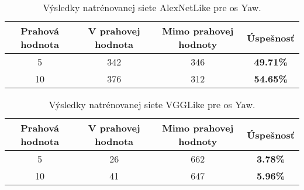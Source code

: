 \begin{table}[H]
    \centering
    \begin{tabular}{|c|c|c|c|}
        \hline
        Prahová hodnota & V prahovej hodnota       & Mimo prahovej hodnoty    & Úspešnosť    \\ \hline
        5               & {\color[HTML]{009901} 342} & {\color[HTML]{9A0000} 346} & \textbf{49.71\%} \\ \hline
        10              & {\color[HTML]{009901} 376} & {\color[HTML]{9A0000} 312} & \textbf{54.65\%} \\ \hline
    \end{tabular}
    \caption{Výsledky natrénovanej siete AlexNetLike pre os Yaw.}
    \label{tab:alexnetyawresults}
\end{table}
\begin{table}[H]
    \centering
    \begin{tabular}{|c|c|c|c|}
        \hline
        Prahová hodnota & V prahovej hodnota       & Mimo prahovej hodnoty    & Úspešnosť    \\ \hline
        5               & {\color[HTML]{009901} 26} & {\color[HTML]{9A0000} 662} & \textbf{3.78\%} \\ \hline
        10              & {\color[HTML]{009901} 41} & {\color[HTML]{9A0000} 647} & \textbf{5.96\%} \\ \hline
    \end{tabular}
    \caption{Výsledky natrénovanej siete VGGLike pre os Yaw.}
    \label{tab:vgglikeyawresults}
\end{table}
